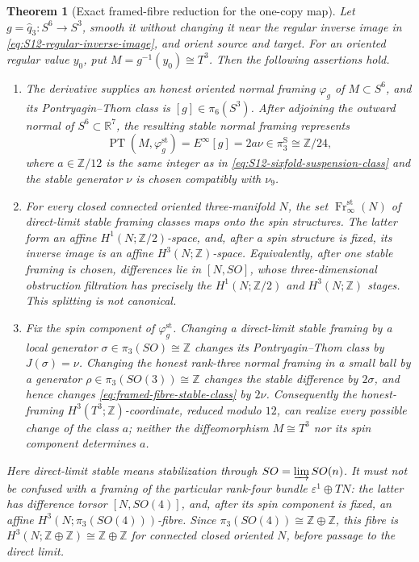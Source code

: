 \documentclass[11pt,letterpaper]{article}
\numberwithin{equation}{section}
\newtheorem{theorem}{Theorem}[section]
\theoremstyle{definition}
\theoremstyle{remark}
\newcommand{\R}{\mathbb R}
\newcommand{\Z}{\mathbb Z}
\begin{document}
\begin{theorem}[Exact framed-fibre reduction for the one-copy map]
\label{thm:one-copy-framing-reduction}
Let \(g=\widehat q_3:S^6\to S^3\), smooth it without changing it near the
regular inverse image in \cref{eq:S12-regular-inverse-image}, and orient
source and target.  For an oriented regular value \(y_0\), put
\(M=g^{-1}(y_0)\cong T^3\).  Then the following assertions hold.
\begin{enumerate}[label=\textup{(\roman*)}]
\item The derivative supplies an honest oriented normal framing
\(\varphi_g\) of \(M\subset S^6\), and its Pontryagin--Thom class is
\([g]\in\pi_6(S^3)\).  After adjoining the outward normal of
\(S^6\subset\R^7\), the resulting stable normal framing represents
\begin{equation}
 \operatorname{PT}(M,\varphi_g^{\mathrm{st}})
 =E^\infty[g]=2a\nu\in\pi_3^{\mathrm S}\cong\Z/24,
 \label{eq:framed-fibre-stable-class}
\end{equation}
where \(a\in\Z/12\) is the same integer as in
\cref{eq:S12-sixfold-suspension-class} and the stable generator
\(\nu\) is chosen compatibly with \(\nu_9\).

\item For every closed connected oriented three-manifold \(N\), the set
\(\operatorname{Fr}^{\mathrm{st}}_\infty(N)\) of direct-limit stable
framing classes maps onto the spin structures.  The latter form an affine
\(H^1(N;\Z/2)\)-space, and, after a spin structure is fixed, its inverse
image is an affine \(H^3(N;\Z)\)-space.  Equivalently, after one stable
framing is chosen, differences lie in
\([N,SO]\), whose three-dimensional obstruction filtration has precisely
the \(H^1(N;\Z/2)\) and \(H^3(N;\Z)\) stages.  This splitting is not
canonical.

\item Fix the spin component of \(\varphi_g^{\mathrm{st}}\).  Changing a
direct-limit stable framing by a local generator
\(\sigma\in\pi_3(SO)\cong\Z\) changes its Pontryagin--Thom class by
\(J(\sigma)=\nu\).  Changing the honest rank-three normal framing in a
small ball by a generator
\(\rho\in\pi_3(SO(3))\cong\Z\) changes the stable difference by
\(2\sigma\), and hence changes \cref{eq:framed-fibre-stable-class} by
\(2\nu\).  Consequently the honest-framing \(H^3(T^3;\Z)\)-coordinate,
reduced modulo \(12\), can realize every possible change of the
class \(a\); neither the diffeomorphism \(M\cong T^3\) nor its spin
component determines \(a\).
\end{enumerate}
Here \emph{direct-limit stable} means stabilization through
\(SO=\varinjlim SO(n)\).  It must not be confused with a framing of the
particular rank-four bundle \(\varepsilon^1\oplus TN\): the latter has
difference torsor \([N,SO(4)]\), and, after its spin component is fixed,
an affine \(H^3(N;\pi_3(SO(4)))\)-fibre.  Since
\(\pi_3(SO(4))\cong\Z\oplus\Z\), this fibre is
\(H^3(N;\Z\oplus\Z)\cong\Z\oplus\Z\) for connected closed oriented
\(N\), before passage to the direct limit.
\end{theorem}
\end{document}
